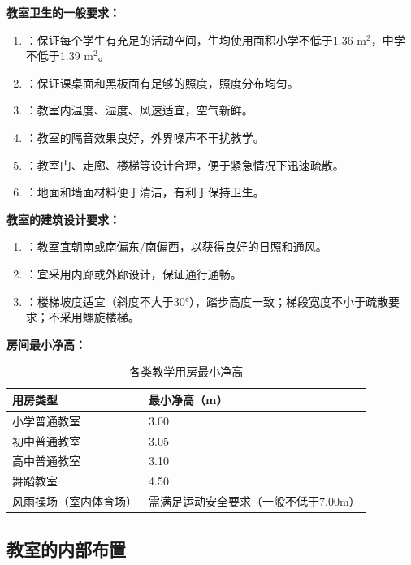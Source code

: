 \begin{keybox}
\textbf{教室卫生的一般要求：}

\begin{enumerate}[leftmargin=*]
    \item {}：保证每个学生有充足的活动空间，生均使用面积小学不低于1.36 $\mathrm{m}^2$，中学不低于1.39 $\mathrm{m}^2$。
    \item {}：保证课桌面和黑板面有足够的照度，照度分布均匀。
    \item {}：教室内温度、湿度、风速适宜，空气新鲜。
    \item {}：教室的隔音效果良好，外界噪声不干扰教学。
    \item {}：教室门、走廊、楼梯等设计合理，便于紧急情况下迅速疏散。
    \item {}：地面和墙面材料便于清洁，有利于保持卫生。
\end{enumerate}

\textbf{教室的建筑设计要求：}

\begin{enumerate}[leftmargin=*]
    \item {}：教室宜朝南或南偏东/南偏西，以获得良好的日照和通风。
    \item {}：宜采用内廊或外廊设计，保证通行通畅。
    \item {}：楼梯坡度适宜（斜度不大于30°），踏步高度一致；梯段宽度不小于疏散要求；不采用螺旋楼梯。
\end{enumerate}

\textbf{房间最小净高：}

\begin{table}[H]
\centering
\caption{各类教学用房最小净高}
\begin{tabularx}{\textwidth}{lX}
\hline
\textbf{用房类型} & \textbf{最小净高（m）} \\
\hline
小学普通教室 & 3.00 \\
初中普通教室 & 3.05 \\
高中普通教室 & 3.10 \\
舞蹈教室 & 4.50 \\
风雨操场（室内体育场） & 需满足运动安全要求（一般不低于7.00m） \\
\hline
\end{tabularx}
\end{table}
\end{keybox}

\subsection{教室的内部布置}

